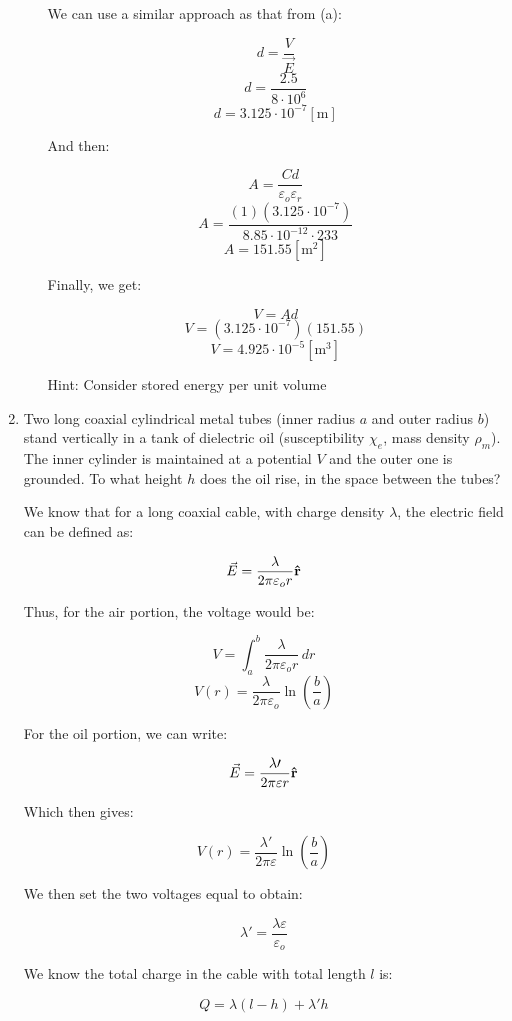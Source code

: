 \begin{enumerate}
\begin{enumerate}
        We can use a similar approach as that from (a):

        $$d=\frac{V}{\vec{E}}$$
        $$d=\frac{2.5}{8\cdot10^6}$$
        $$d=3.125\cdot10^{-7}[\si{\meter}]$$

        And then:

        $$A=\frac{Cd}{\varepsilon_o\varepsilon_r}$$
        $$A=\frac{(1)(3.125\cdot10^{-7})}{8.85\cdot10^{-12}\cdot233}$$
        $$A=151.55[\si{\meter\squared}]$$

        Finally, we get:

        $$V=Ad$$
        $$V=\left( 3.125\cdot10^{-7} \right)\left( 151.55 \right)$$
        $$\boxed{V=4.925\cdot10^{-5}[\si{\meter\cubed}]}$$

      Hint: Consider stored energy per unit volume

    \end{enumerate}

  \item Two long coaxial cylindrical metal tubes (inner radius $a$ and outer radius $b$) stand vertically in a tank of dielectric oil (susceptibility $\chi_e$, mass density $\rho_m$).  The inner cylinder is maintained at a potential $V$ and the outer one is grounded. To what height $h$ does the oil rise, in the space between the tubes?

    We know that for a long coaxial cable, with charge density $\lambda$, the electric field can be defined as:

    $$\vec{E}=\frac{\lambda}{2\pi\varepsilon_o r}\bold{\hat{r}}$$

    Thus, for the air portion, the voltage would be:

    $$V=\int_a^b \frac{\lambda}{2\pi\varepsilon_o r}\,dr$$
    $$V(r)=\frac{\lambda}{2\pi\varepsilon_o}\ln\left( \frac{b}{a} \right)$$

    For the oil portion, we can write:

    $$\vec{E}=\frac{\lambda\prime}{2\pi\varepsilon r}\bold{\hat{r}}$$

    Which then gives:

    $$V(r)=\frac{\lambda\prime}{2\pi\varepsilon}\ln\left( \frac{b}{a} \right)$$

    We then set the two voltages equal to obtain:

    $$\lambda\prime=\frac{\lambda\varepsilon}{\varepsilon_o}$$

    We know the total charge in the cable with total length $l$ is:

    $$Q=\lambda(l-h)+\lambda\prime h$$


\end{enumerate}
